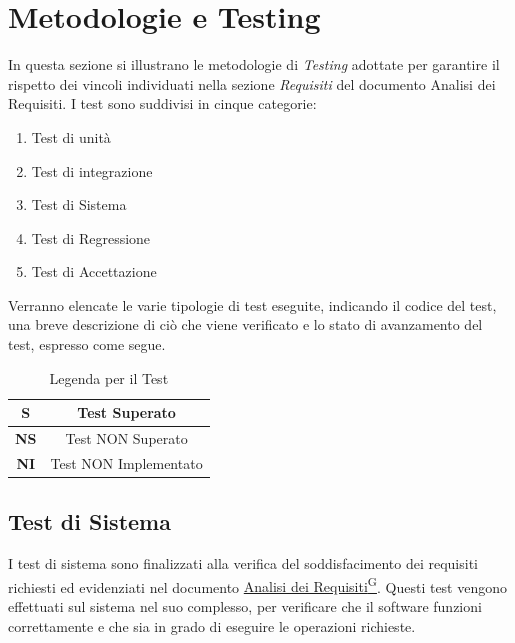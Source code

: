 \documentclass{article}
\begin{document}
\section{Metodologie e Testing}
In questa sezione si illustrano le metodologie di \textit{Testing} adottate per garantire il rispetto dei vincoli individuati
nella sezione \textit{Requisiti} del documento Analisi dei Requisiti. I test sono suddivisi in cinque categorie:
\begin{enumerate}
    \item Test di unità
    \item Test di integrazione
    \item Test di Sistema
    \item Test di Regressione
    \item Test di Accettazione
\end{enumerate}
Verranno elencate le varie tipologie di test eseguite, indicando il codice del test, una breve descrizione di ciò che viene verificato e lo stato di avanzamento del test, espresso come segue.

\begin{table}[H]
    \centering
    \renewcommand{\arraystretch}{1.5}
\begin{tabular}{|c|c|}
    \hline
    \textbf{S} & Test Superato \\
    \hline
    \textbf{NS} & Test NON Superato \\
    \hline
    \textbf{NI} & Test NON Implementato \\
    \hline
\end{tabular}
\caption{Legenda per il Test}
\end{table}


\subsection{Test di Sistema} %
I test di sistema sono finalizzati alla verifica del soddisfacimento dei requisiti richiesti ed evidenziati nel documento
\href{https://code7crusaders.github.io/docs/PB/documentazione_interna/glossario.html#analisi-dei-requisiti}{Analisi dei Requisiti\textsuperscript{G}}. Questi test vengono effettuati sul sistema nel suo complesso, per verificare che il software funzioni correttamente
e che sia in grado di eseguire le operazioni richieste.

\renewcommand{\arraystretch}{1.5}  %
\end{document}
